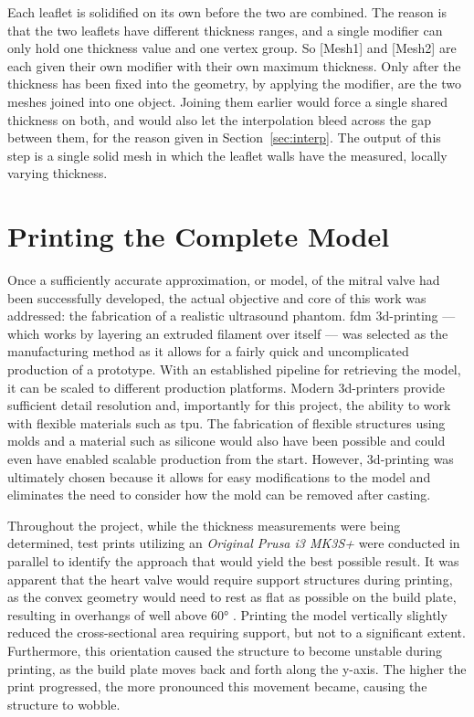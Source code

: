 Each leaflet is solidified on its own before the two are combined. The reason is
that the two leaflets have different thickness ranges, and a single modifier can
only hold one thickness value and one vertex group. So [Mesh1] and [Mesh2]
are each given their own modifier with their own maximum thickness. Only after the
thickness has been fixed into the geometry, by applying the modifier, are the two
meshes joined into one object. Joining them earlier would force a single shared
thickness on both, and would also let the interpolation bleed across the gap
between them, for the reason given in Section~\ref{sec:interp}. The output of this step is a single solid mesh in which the leaflet walls have the
measured, locally varying thickness.

\section{Printing the Complete Model}\label{sec:print}
Once a sufficiently accurate approximation, or model, of the mitral valve had been successfully developed, the actual objective and core of this work was addressed: the fabrication of a realistic ultrasound phantom. \Gls{fdm} \gls{3d}-printing --- which works by layering an extruded filament over itself --- was selected as the manufacturing method \cite{medellin2019design} as it allows for a fairly quick and uncomplicated production of a prototype. With an established pipeline for retrieving the model, it can be scaled to different production platforms. Modern \gls{3d}-printers provide sufficient detail resolution and, importantly for this project, the ability to work with flexible materials such as \gls{tpu}. The fabrication of flexible structures using molds and a material such as silicone would also have been possible and could even have enabled scalable production from the start. However, \gls{3d}-printing was ultimately chosen because it allows for easy modifications to the model and eliminates the need to consider how the mold can be removed after casting.

Throughout the project, while the thickness measurements were being determined, test prints utilizing an \emph{Original Prusa i3 MK3S+} were conducted in parallel to identify the approach that would yield the best possible result. It was apparent that the heart valve would require support structures during printing, as the convex geometry would need to rest as flat as possible on the build plate, resulting in overhangs of well above 60° \cite{medellin2019design}. Printing the model vertically slightly reduced the cross-sectional area requiring support, but not to a significant extent. Furthermore, this orientation caused the structure to become unstable during printing, as the build plate moves back and forth along the y-axis. The higher the print progressed, the more pronounced this movement became, causing the structure to wobble.

